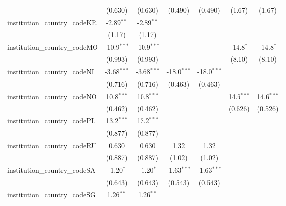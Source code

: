 \begin{tabular}{lcccccc}
                                         & (0.630)       & (0.630)       & (0.490)       & (0.490)       & (1.67)        & (1.67)\\   
   institution\_country\_codeKR          & -2.89$^{**}$  & -2.89$^{**}$  &               &               &               &   \\   
                                         & (1.17)        & (1.17)        &               &               &               &   \\   
   institution\_country\_codeMO          & -10.9$^{***}$ & -10.9$^{***}$ &               &               & -14.8$^{*}$   & -14.8$^{*}$\\   
                                         & (0.993)       & (0.993)       &               &               & (8.10)        & (8.10)\\   
   institution\_country\_codeNL          & -3.68$^{***}$ & -3.68$^{***}$ & -18.0$^{***}$ & -18.0$^{***}$ &               &   \\   
                                         & (0.716)       & (0.716)       & (0.463)       & (0.463)       &               &   \\   
   institution\_country\_codeNO          & 10.8$^{***}$  & 10.8$^{***}$  &               &               & 14.6$^{***}$  & 14.6$^{***}$\\   
                                         & (0.462)       & (0.462)       &               &               & (0.526)       & (0.526)\\   
   institution\_country\_codePL          & 13.2$^{***}$  & 13.2$^{***}$  &               &               &               &   \\   
                                         & (0.877)       & (0.877)       &               &               &               &   \\   
   institution\_country\_codeRU          & 0.630         & 0.630         & 1.32          & 1.32          &               &   \\   
                                         & (0.887)       & (0.887)       & (1.02)        & (1.02)        &               &   \\   
   institution\_country\_codeSA          & -1.20$^{*}$   & -1.20$^{*}$   & -1.63$^{***}$ & -1.63$^{***}$ &               &   \\   
                                         & (0.643)       & (0.643)       & (0.543)       & (0.543)       &               &   \\   
   institution\_country\_codeSG          & 1.26$^{**}$   & 1.26$^{**}$   &               &               &               &   \\   

\end{tabular}
